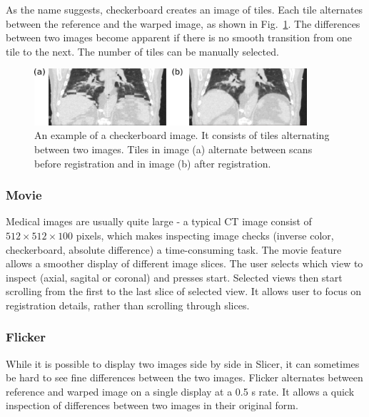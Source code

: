 As the name suggests, checkerboard creates an image of tiles. Each tile alternates between the reference and the warped image, as shown in Fig.~\ref{checkerboard}. The differences between two images become apparent if there is no smooth transition from one tile to the next. 
The number of tiles can be manually selected.
\newpage
\begin{figure}[H]
	\begin{center}		
		\includegraphics[width=0.9\textwidth]{./Vmm/Images/checkerboard.png}
		\caption{An example of a checkerboard image. It consists of tiles alternating between two images. Tiles in image (a) alternate between scans before registration and in image (b) after registration.}
		\label{checkerboard}
	\end{center}
\end{figure}

\subsubsection{Movie}

Medical images are usually quite large - a typical CT image consist of $512 \times 512 \times 100$ pixels, which makes inspecting image checks (inverse color, checkerboard, absolute difference) a time-consuming task. 
The movie feature allows a smoother display of different image slices. 
The user selects which view to inspect (axial, sagital or coronal) and presses start. Selected views then start scrolling from the first to the last slice of selected view. It allows user to focus on registration details, rather than scrolling through slices.



\subsubsection{Flicker}

While it is possible to display two images side by side in Slicer, it can sometimes be hard to see fine differences between the two images. Flicker alternates between reference and warped image on a single display at a 0.5 s rate. It allows
a quick inspection of differences between two images in their original form.

